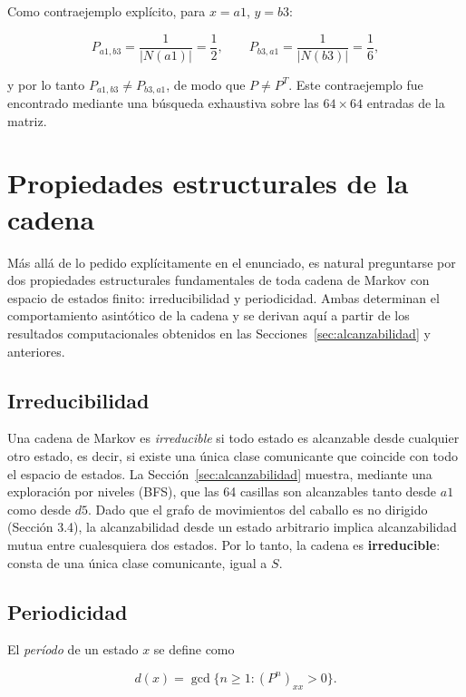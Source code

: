 \documentclass[12pt,a4paper]{article}
\begin{document}
Como contraejemplo explícito, para \(x=a1\), \(y=b3\):

\[
P_{a1,b3}=\frac{1}{|N(a1)|}=\frac12,
\qquad
P_{b3,a1}=\frac{1}{|N(b3)|}=\frac16,
\]

y por lo tanto \(P_{a1,b3}\neq P_{b3,a1}\), de modo que
\(P\neq P^{T}\). Este contraejemplo fue encontrado mediante una
búsqueda exhaustiva sobre las \(64\times64\) entradas de la matriz.


\section{Propiedades estructurales de la cadena}

Más allá de lo pedido explícitamente en el enunciado, es natural
preguntarse por dos propiedades estructurales fundamentales de toda
cadena de Markov con espacio de estados finito: irreducibilidad y
periodicidad. Ambas determinan el comportamiento asintótico de la
cadena y se derivan aquí a partir de los resultados computacionales
obtenidos en las Secciones~\ref{sec:alcanzabilidad} y anteriores.

\subsection{Irreducibilidad}

Una cadena de Markov es \emph{irreducible} si todo estado es
alcanzable desde cualquier otro estado, es decir, si existe una única
clase comunicante que coincide con todo el espacio de estados. La
Sección~\ref{sec:alcanzabilidad} muestra, mediante una exploración por
niveles (BFS), que las 64 casillas son alcanzables tanto desde \(a1\)
como desde \(d5\). Dado que el grafo de movimientos del caballo es no
dirigido (Sección 3.4), la alcanzabilidad desde un estado arbitrario
implica alcanzabilidad mutua entre cualesquiera dos estados. Por lo
tanto, la cadena es \textbf{irreducible}: consta de una única clase
comunicante, igual a \(S\).

\subsection{Periodicidad}

El \emph{período} de un estado \(x\) se define como

\[
d(x)=\gcd\{n\geq1: (P^n)_{xx}>0\}.
\]
\end{document}
